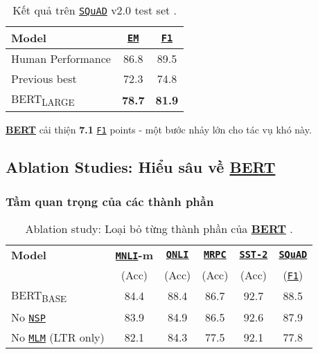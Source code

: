     \begin{table}[H]
        \centering
        \caption{Kết quả trên \hyperref[acro:squad]{\texttt{SQuAD}} v2.0 test set \cite{devlin2018bert}.}
        \label{tab:squad_v2_results}
        \begin{tabular}{lcc}
            \toprule
            \textbf{Model} & \textbf{\hyperref[acro:em]{\texttt{EM}}} & \textbf{\hyperref[acro:f1]{\texttt{F1}}} \\
            \midrule
            Human Performance & 86.8 & 89.5 \\
            Previous best & 72.3 & 74.8 \\
            \midrule
            BERT\textsubscript{LARGE} & \textbf{78.7} & \textbf{81.9} \\
            \bottomrule
        \end{tabular}
    \end{table}
    
    \hyperref[acro:bert]{\textbf{BERT}} cải thiện \textbf{7.1} \hyperref[acro:f1]{\texttt{F1}} points - một bước nhảy lớn cho tác vụ khó này.
    
    \subsection{Ablation Studies: Hiểu sâu về \hyperref[acro:bert]{\textbf{BERT}}}
    \label{ssec:ablation_study_bert}
    
    \subsubsection{Tầm quan trọng của các thành phần}
    \begin{table}[H]
        \centering
        \caption{Ablation study: Loại bỏ từng thành phần của \hyperref[acro:bert]{\textbf{BERT}} \cite{devlin2018bert}.}
        \label{tab:ablation_components}
        \begin{tabular}{lccccc}
            \toprule
            \textbf{Model} & \textbf{\hyperref[acro:mnli]{\texttt{MNLI}}-m} & \textbf{\hyperref[acro:qnli]{\texttt{QNLI}}} & \textbf{\hyperref[acro:mrpc]{\texttt{MRPC}}} & \textbf{\hyperref[acro:sst2]{\texttt{SST-2}}} & \textbf{\hyperref[acro:squad]{\texttt{SQuAD}}} \\
            & (Acc) & (Acc) & (Acc) & (Acc) & (\hyperref[acro:f1]{\texttt{F1}}) \\
            \midrule
            BERT\textsubscript{BASE} & 84.4 & 88.4 & 86.7 & 92.7 & 88.5 \\
            \midrule
            No \hyperref[acro:nsp]{\texttt{NSP}} & 83.9 & 84.9 & 86.5 & 92.6 & 87.9 \\
            No \hyperref[acro:mlm]{\texttt{MLM}} (LTR only) & 82.1 & 84.3 & 77.5 & 92.1 & 77.8 \\
            \bottomrule
        \end{tabular}
    \end{table}
    
